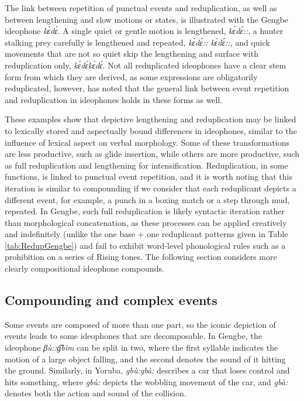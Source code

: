 \documentclass[output=paper,colorlinks,citecolor=brown]{langscibook}
\begin{document}
The link between repetition of punctual events and reduplication, as well as between lengthening and slow motions or states, is illustrated with the Gengbe ideophone \textit{kɛ́dɛ́}. A single quiet or gentle motion is lengthened, \textit{kɛ́dɛ́::}, a hunter stalking prey carefully is lengthened and repeated, \textit{kɛ́dɛ́:: kɛ́dɛ́::}, and quick movements that are not so quiet skip the lengthening and surface with reduplication only, \textit{kɛ́dɛ́kɛ́dɛ́}. Not all reduplicated ideophones have a clear stem form from which they are derived, as some expressions are obligatorily reduplicated, however, \citet{Ameka2001} has noted that the general link between event repetition and reduplication in  ideophones holds in these forms as well.

These examples show that depictive lengthening and reduplication may be linked to lexically stored and aspectually bound differences in ideophones, similar to the influence of lexical aspect on verbal morphology. Some of these transformations are less productive, such as glide insertion, while others are more productive, such as full reduplication and lengthening for intensification. Reduplication, in some functions, is linked to punctual event repetition, and it is worth noting that this iteration is similar to compounding if we consider that each reduplicant depicts a different event, for example, a punch in a boxing match or a step through mud, repeated. In Gengbe, such full reduplication is likely syntactic iteration rather than morphological concatenation, as these processes can be applied creatively and indefinitely (unlike the one base + one reduplicant patterns given in Table \ref{tab:RedupGengbe}) and fail to exhibit word-level phonological rules such as a prohibition  on a series of Rising tones. The following section considers more clearly compositional ideophone compounds.

\subsection{Compounding and complex events}

Some events are composed of more than one part, so the iconic depiction of events leads to some ideophones that are decomposable. In Gengbe, the ideophone \textit{βù::g͡bìm} can be split in two, where the first syllable indicates the motion of a large object falling, and the second denotes the sound of it hitting the ground. Similarly, in Yoruba, \textit{gbù:gbà:} describes a car that loses control and hits something, where \textit{gbù:} depicts the wobbling movement of the car, and \textit{gbà:} denotes both the action and sound of the collision. 
\end{document}
